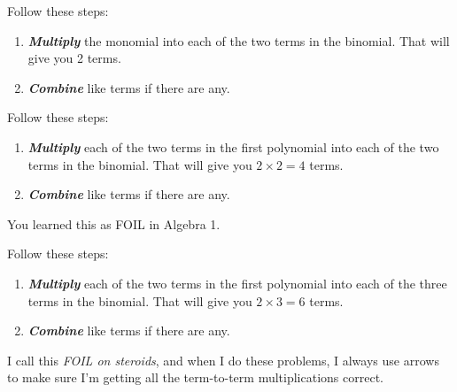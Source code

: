 \documentclass[fleqn,letterpaper,12pt,printwatermark=false]{memoir}
\begin{document}
\begin{myKeyConcepts}
    Follow these steps:
    \begin{enumerate}
        \item {\bfseries\itshape Multiply} the monomial
        into each of the two terms in the binomial. 
        That will give you 2 terms.
        \item {\bfseries\itshape Combine} like terms if there are any.
    \end{enumerate}
\end{myKeyConcepts}



\begin{myKeyConcepts}
    Follow these steps:
    \begin{enumerate}
        \item {\bfseries\itshape Multiply} each of the two terms in the first polynomial
        into each of the two terms in the binomial. That will give you $2 \times 2=4$ terms.
        \item {\bfseries\itshape Combine} like terms if there are any.
    \end{enumerate}
    You learned this as FOIL in Algebra 1.
\end{myKeyConcepts}




\begin{myKeyConcepts}
    Follow these steps:
    \begin{enumerate}
        \item {\bfseries\itshape Multiply} each of the two terms in the first polynomial
        into each of the three terms in the binomial. That will give you $2 \times 3=6$ terms.
        \item {\bfseries\itshape Combine} like terms if there are any.
    \end{enumerate}
    I call this \emph{FOIL on steroids},
    and when I do these problems, I always use arrows to make sure 
    I'm getting all the term-to-term multiplications correct.
\end{myKeyConcepts}
\end{document}
